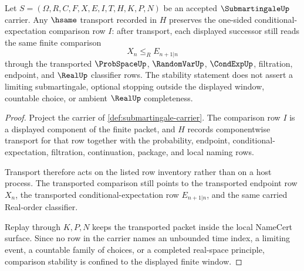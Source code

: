 \begin{theorem}
\label{thm:submartingale-one-sided-comparison-stability}
Let $S=(\Omega,R,C,F,X,E,I,T,H,K,P,N)$ be an accepted $\SubmartingaleUp$ carrier. Any $\hsame$ transport recorded in $H$ preserves the one-sided conditional-expectation comparison row $I$: after transport, each displayed successor still reads the same finite comparison
$$
X_n\leq_R E_{n+1|n}
$$
through the transported $\ProbSpaceUp$, $\RandomVarUp$, $\CondExpUp$, filtration, endpoint, and $\RealUp$ classifier rows. The stability statement does not assert a limiting submartingale, optional stopping outside the displayed window, countable choice, or ambient $\RealUp$ completeness.
\end{theorem}
\begin{proof}
Project the carrier of \autoref{def:submartingale-carrier}. The comparison row $I$ is a displayed component of the finite packet, and $H$ records componentwise transport for that row together with the probability, endpoint, conditional-expectation, filtration, continuation, package, and local naming rows.

Transport therefore acts on the listed row inventory rather than on a host process. The transported comparison still points to the transported endpoint row $X_n$, the transported conditional-expectation row $E_{n+1|n}$, and the same carried Real-order classifier.

Replay through $K,P,N$ keeps the transported packet inside the local NameCert surface. Since no row in the carrier names an unbounded time index, a limiting event, a countable family of choices, or a completed real-space principle, comparison stability is confined to the displayed finite window.
\end{proof}

